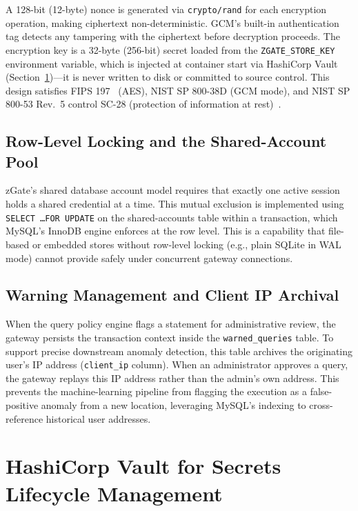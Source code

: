 A 128-bit (12-byte) nonce is generated via \texttt{crypto/rand} for each encryption operation, making ciphertext non-deterministic. GCM's built-in authentication tag detects any tampering with the ciphertext before decryption proceeds. The encryption key is a 32-byte (256-bit) secret loaded from the \texttt{ZGATE\_STORE\_KEY} environment variable, which is injected at container start via HashiCorp Vault (Section~\ref{sec:vault})---it is never written to disk or committed to source control. This design satisfies FIPS 197~\cite{fips-197} (AES), NIST SP 800-38D (GCM mode), and NIST SP 800-53 Rev.\ 5 control SC-28 (protection of information at rest)~\cite{nist-controls}.

\subsection{Row-Level Locking and the Shared-Account Pool}

zGate's shared database account model requires that exactly one active session holds a shared credential at a time. This mutual exclusion is implemented using \texttt{SELECT \ldots FOR UPDATE} on the shared-accounts table within a transaction, which MySQL's InnoDB engine enforces at the row level. This is a capability that file-based or embedded stores without row-level locking (e.g., plain SQLite in WAL mode) cannot provide safely under concurrent gateway connections.

\subsection{Warning Management and Client IP Archival}

When the query policy engine flags a statement for administrative review, the gateway persists the transaction context inside the \texttt{warned\_queries} table. To support precise downstream anomaly detection, this table archives the originating user's IP address (\texttt{client\_ip} column). When an administrator approves a query, the gateway replays this IP address rather than the admin's own address. This prevents the machine-learning pipeline from flagging the execution as a false-positive anomaly from a new location, leveraging MySQL's indexing to cross-reference historical user addresses.

\section{HashiCorp Vault for Secrets Lifecycle Management}
\label{sec:vault}

